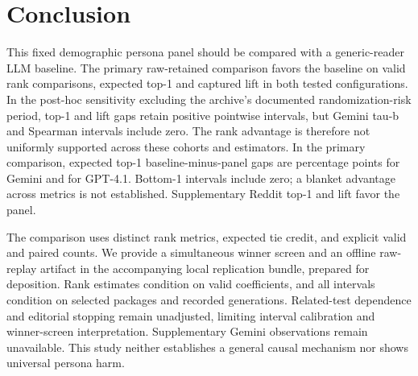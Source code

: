 \section{Conclusion}
This fixed demographic persona panel should be compared with a generic-reader LLM baseline.
The primary raw-retained comparison favors the baseline on valid rank comparisons, expected
top-1 and captured lift in both tested configurations. In the post-hoc sensitivity excluding the
archive's documented randomization-risk period, top-1 and lift gaps retain positive pointwise
intervals, but Gemini tau-b and Spearman intervals include zero. The rank advantage is therefore
not uniformly supported across these cohorts and estimators. In the primary comparison, expected top-1 baseline-minus-panel gaps
are \newGeminiGapTopOne{} percentage points for Gemini and \newGptGapTopOne{} for GPT-4.1.
Bottom-1 intervals include zero; a blanket advantage across metrics is not established.
Supplementary Reddit top-1 and lift favor the panel.

The comparison uses distinct rank metrics, expected tie credit, and explicit valid and paired counts.
We provide a simultaneous winner screen and an offline raw-replay artifact in the accompanying local
replication bundle, prepared for deposition. Rank estimates condition on valid coefficients, and all intervals condition on
selected packages and recorded generations. Related-test dependence and editorial stopping
remain unadjusted, limiting interval calibration and winner-screen interpretation. Supplementary Gemini observations remain unavailable. This study neither establishes
a general causal mechanism nor shows universal persona harm.
